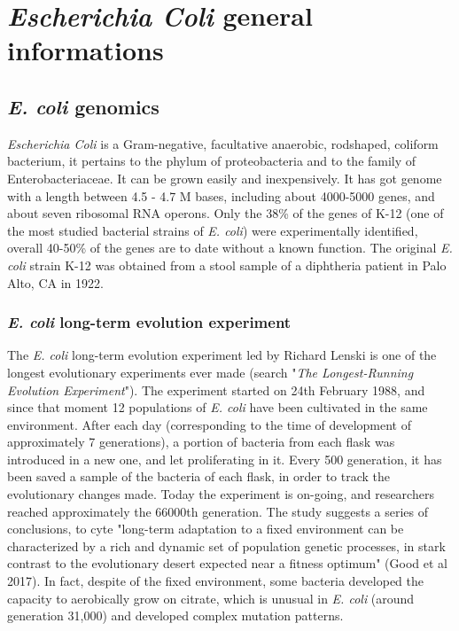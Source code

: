 \graphicspath{{chapters/images/01/}}

\chapter{\emph{Escherichia Coli} general informations}
\section{\emph{E. coli} genomics}
\emph{Escherichia Coli} is a Gram-negative, facultative anaerobic, rodshaped, coliform bacterium, it pertains to the phylum of proteobacteria and to the family of Enterobacteriaceae. It can be grown easily and inexpensively. It has got genome with a length between 4.5 - 4.7 M bases, including about 4000-5000 genes, and about seven ribosomal RNA operons. Only the 38\% of the genes of K-12 (one of the most studied bacterial strains of \emph{E. coli}) were experimentally identified, overall 40-50\% of the genes are to date without a known function.
The original \emph{E. coli} strain K-12 was obtained from a stool sample of a
diphtheria patient in Palo Alto, CA in 1922.

\subsection{\emph{E. coli} long-term evolution experiment}
The \emph{E. coli} long-term evolution experiment led by Richard Lenski is one of the longest evolutionary experiments ever made (search "\textit{The Longest-Running Evolution Experiment}"). The experiment started on 24th February 1988, and since that moment 12 populations of \emph{E. coli} have been cultivated in the same environment. After each day (corresponding to the time of development of approximately 7 generations), a portion of bacteria from each flask was introduced in a new one, and let proliferating in it. Every 500 generation, it has been saved a sample of the bacteria of each flask, in order to track the evolutionary changes made. Today the experiment is on-going, and researchers reached approximately the 66000th generation. The study suggests a series of conclusions, to cyte "long-term adaptation to a fixed environment can be characterized by a rich and dynamic set of population genetic processes, in stark contrast to the evolutionary desert expected near a fitness optimum" (Good et al 2017). In fact, despite of the fixed environment, some bacteria developed the capacity to aerobically grow on citrate, which is unusual in \emph{E. coli} (around generation 31,000) and developed complex mutation patterns.


